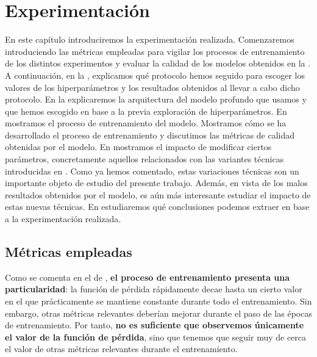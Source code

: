 \chapter{Experimentación} \label{ich:Experimentación}

En este capítulo introduciremos la experimentación realizada. Comenzaremos introduciendo las métricas empleadas para vigilar los procesos de entrenamiento de los distintos experimentos y evaluar la calidad de los modelos obtenidos en la . A continuación, en la , explicamos qué protocolo hemos seguido para escoger los valores de los hiperparámetros y los resultados obtenidos al llevar a cabo dicho protocolo. En la  explicaremos la arquitectura del modelo profundo que usamos y que hemos escogido en base a la previa exploración de hiperparámetros. En  mostramos el proceso de entrenamiento del modelo. Mostramos cómo se ha desarrollado el proceso de entrenamiento y discutimos las métricas de calidad obtenidas por el modelo. En  mostramos el impacto de modificar ciertos parámetros, concretamente aquellos relacionados con las variantes técnicas introducidas en . Como ya hemos comentado, estas variaciones técnicas son un importante objeto de estudio del presente trabajo. Además, en vista de los malos resultados obtenidos por el modelo, es aún más interesante estudiar el impacto de estas nuevas técnicas. En  estudiaremos qué conclusiones podemos extraer en base a la experimentación realizada.

\section{Métricas empleadas} \label{isec:metricas_teoria}

Como se comenta en el  de \cite{informatica:principal}, \textbf{el proceso de entrenamiento presenta una particularidad}: la función de pérdida rápidamente decae hasta un cierto valor en el que prácticamente se mantiene constante durante todo el entrenamiento. Sin embargo, otras métricas relevantes deberían mejorar durante el paso de las épocas de entrenamiento. Por tanto, \textbf{no es suficiente que observemos únicamente el valor de la función de pérdida}, sino que tenemos que seguir muy de cerca el valor de otras métricas relevantes durante el entrenamiento.

